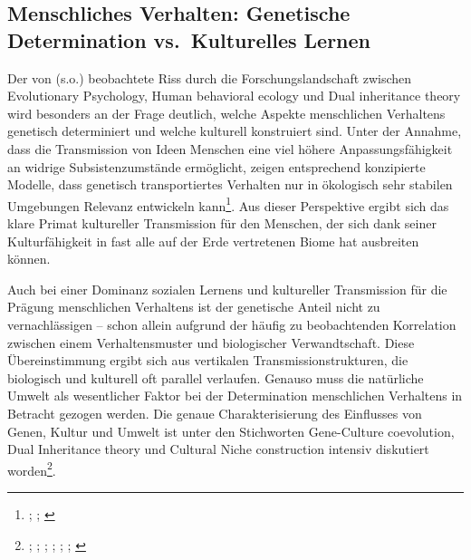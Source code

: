 \documentclass[openany,twoside,twocolumn]{book}
\let\rmarkdownfootnote\footnote%
\def\footnote{\protect\rmarkdownfootnote}
\begin{document}
\hypertarget{menschliches-verhalten-genetische-determination-vs.kulturelles-lernen}{%
\subsection{Menschliches Verhalten: Genetische Determination
vs.~Kulturelles
Lernen}\label{menschliches-verhalten-genetische-determination-vs.kulturelles-lernen}}

Der von \autocite{smith_three_2000} (s.o.) beobachtete Riss durch die
Forschungslandschaft zwischen Evolutionary Psychology, Human behavioral
ecology und Dual inheritance theory wird besonders an der Frage
deutlich, welche Aspekte menschlichen Verhaltens genetisch determiniert
und welche kulturell konstruiert sind. Unter der Annahme, dass die
Transmission von Ideen Menschen eine viel höhere Anpassungsfähigkeit an
widrige Subsistenzumstände ermöglicht, zeigen entsprechend konzipierte
Modelle, dass genetisch transportiertes Verhalten nur in ökologisch sehr
stabilen Umgebungen Relevanz entwickeln kann\footnote{\textcite{aoki_emergence_2005};
  \textcite{aoki_evolution_2014}; \textcite{boyd_cultural_1983}}. Aus
dieser Perspektive ergibt sich das klare Primat kultureller Transmission
für den Menschen, der sich dank seiner Kulturfähigkeit in fast alle auf
der Erde vertretenen Biome hat ausbreiten können.

Auch bei einer Dominanz sozialen Lernens und kultureller Transmission
für die Prägung menschlichen Verhaltens ist der genetische Anteil nicht
zu vernachlässigen -- schon allein aufgrund der häufig zu beobachtenden
Korrelation zwischen einem Verhaltensmuster und biologischer
Verwandtschaft. Diese Übereinstimmung ergibt sich aus vertikalen
Transmissionstrukturen, die biologisch und kulturell oft parallel
verlaufen. Genauso muss die natürliche Umwelt als wesentlicher Faktor
bei der Determination menschlichen Verhaltens in Betracht gezogen
werden. Die genaue Charakterisierung des Einflusses von Genen, Kultur
und Umwelt ist unter den Stichworten Gene-Culture coevolution, Dual
Inheritance theory und Cultural Niche construction intensiv diskutiert
worden\footnote{\textcite{aoki_gene-culture_2017};
  \textcite{boyd_culture_1985}; \textcite{cavalli-sforza_cultural_1981};
  \textcite{chudek_culturegene_2011}; \textcite{feldman_aspects_1979};
  \textcite{mesoudi_towards_2006}; \textcite{richerson_dual_1978}}.
\end{document}
